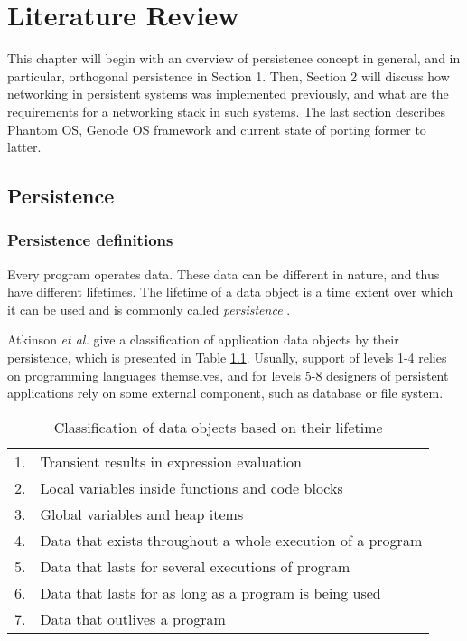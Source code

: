\chapter{Literature Review}
\label{chap:lr}

This chapter will begin with an overview of persistence concept in general,
and in particular, orthogonal persistence in Section 1. Then, Section 2 will
discuss how networking in persistent systems was implemented previously, and
what are the requirements for a networking stack in such systems. The last
section describes Phantom OS, Genode OS framework and current state of
porting former to latter.

\section{Persistence}
\subsection{Persistence definitions}
Every program operates data. These data can be different in nature,
and thus have different lifetimes. The lifetime of a data object is a time extent
over which it can be used and is commonly called \textit{persistence} 
\cite{atkinson1983ps}. 

Atkinson \textit{et al.} \cite{atkinson1995orthogonally,atkinson1983ps} give a 
classification of application data objects by their persistence, which is
presented in Table \ref{tab:data_lifetimes}. Usually, support of levels 1-4
relies on programming languages themselves, and for levels 5-8 designers of
persistent applications rely on some external component, such as database or 
file system. 

\begin{longtable}{cl}
\caption[Classification of data objects based on their lifetime]{Classification 
of data objects based on their lifetime} 
\label{tab:data_lifetimes} \\
\hline
1. & Transient results in expression evaluation \\
2. & Local variables inside functions and code blocks \\
3. & Global variables and heap items \\
4. & Data that exists throughout a whole execution of a program \\
5. & Data that lasts for several executions of program \\
6. & Data that lasts for as long as a program is being used \\
7. & Data that outlives a program \\
\hline
\end{longtable}

